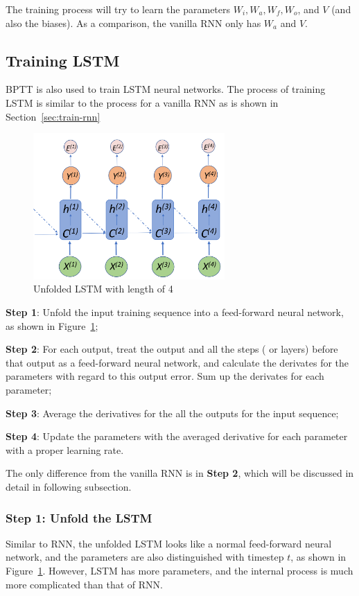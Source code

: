 \documentclass[english]{article}
\begin{document}
The training process will try to learn the parameters $W_i, W_a, W_f, W_o$, and $V$ (and also the biases). As a comparison, the vanilla RNN
only has $W_a$ and $V$.

\subsection{Training LSTM}
BPTT is also used to train LSTM neural networks. The process of training LSTM is similar to the process for a vanilla RNN as is shown in Section~\ref{sec:train-rnn}

\begin{figure}[htbp]
	\centering
	\includegraphics[width=0.65\textwidth, keepaspectratio]{lstm}
	\caption{Unfolded LSTM with length of 4}
	\label{fig:lstm}
\end{figure}


\textbf{Step 1}: Unfold the input training sequence into a feed-forward neural network, as shown in Figure~\ref{fig:lstm};

\textbf{Step 2}: For each output, treat the output and all the steps ( or layers) before that output as a feed-forward neural network,
and calculate the derivates for the parameters with regard to this output error. Sum up the derivates for each parameter;

\textbf{Step 3}: Average the derivatives for the all the outputs for the input sequence;

\textbf{Step 4}: Update the parameters with the averaged derivative for each parameter with a proper learning rate.

The only difference from the vanilla RNN is in \textbf{Step 2}, which will be discussed in detail in following subsection.

\subsubsection{Step 1: Unfold the LSTM}
Similar to RNN, the unfolded LSTM looks like a normal feed-forward neural network, and the parameters are also distinguished with timestep $t$, as shown in Figure~\ref{fig:lstm}. 
However, LSTM has more parameters, and the internal process is much more complicated than that of RNN.
\end{document}
